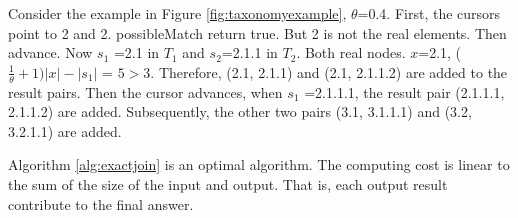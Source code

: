 \smallskip
\smallskip

\begin{example}
Consider the example in Figure \ref{fig:taxonomyexample}, $\theta$=0.4. First, the cursors point to 2 and 2. possibleMatch return true. But 2 is not the real elements.  Then advance. Now $s_1$ =2.1 in $T_1$  and $s_2$=2.1.1 in $T_2$. Both real nodes. $x$=2.1, ($\frac{1}{\theta}+1)|x|-|s_1|$ = $5 > 3$. Therefore, (2.1, 2.1.1) and (2.1, 2.1.1.2) are added to the result pairs. Then the cursor advances, when $s_1$ =2.1.1.1, the result pair (2.1.1.1, 2.1.1.2) are added. Subsequently, the other two pairs (3.1, 3.1.1.1) and (3.2, 3.2.1.1) are added.
\end{example}

\smallskip
\smallskip


\begin{theorem}  Algorithm \ref{alg:exactjoin} is an optimal algorithm. The computing cost is linear to the sum of the size of the input and output. That is, each output result contribute to the final answer.
\end{theorem}





